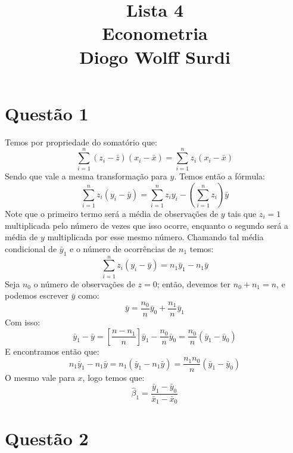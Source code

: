 \documentclass[12pt]{article}
\title{Lista 4\\
Econometria\\
Diogo Wolff Surdi}
\begin{document}
\maketitle 

\section*{Questão 1}
Temos por propriedade do somatório que:
\begin{equation*}
\sum_{i=1}^{n}(z_{i}-\bar{z})(x_{i}-\bar{x})=\sum_{i=1}^{n}z_{i}(x_{i}-\bar{x})
\end{equation*}
Sendo que vale a mesma transformação para $y$. Temos então a fórmula:
\begin{equation*}
\sum_{i=1}^{n}z_{i}(y_{i}-\bar{y})=\sum_{i=1}^{n}z_{i}y_{i}-\left(\sum_{i=1}^{n} z_{i}\right)\bar{y}
\end{equation*}
Note que o primeiro termo será a média de observações de $y$ tais que $z_{i}=1$ multiplicada pelo número de vezes que isso ocorre, enquanto o segundo será a média de $y$ multiplicada por esse mesmo número. Chamando tal média condicional de $\bar{y}_{1}$ e o número de ocorrências de $n_{1}$ temos:
\begin{equation*}
\sum_{i=1}^{n}z_{i}(y_{i}-\bar{y}) = n_{1}\bar{y}_{1}-n_{1}\bar{y}
\end{equation*}
Seja $n_{0}$ o número de observações de $z=0$; então, devemos ter $n_{0}+n_{1}=n$, e podemos escrever $\bar{y}$ como:
\begin{equation*}
\bar{y}=\frac{n_{0}}{n}\bar{y}_{0}+\frac{n_{1}}{n}\bar{y}_{1}
\end{equation*}
Com isso:
\begin{equation*}
\bar{y}_{1}-\bar{y}=\left[\frac{n-n_{1}}{n}\right]\bar{y}_{1}
-\frac{n_{0}}{n}\bar{y}_{0}=\frac{n_{0}}{n}(\bar{y}_{1}-\bar{y}_{0})
\end{equation*}
E encontramos então que:
\begin{equation*}
n_{1}\bar{y}_{1}-n_{1}\bar{y} = n_{1}(\bar{y}_{1}-n_{1}\bar{y}) =
\frac{n_{1}n_{0}}{n}(\bar{y}_{1}-\bar{y}_{0})
\end{equation*}
O mesmo vale para $x$, logo temos que:
\begin{equation*}
\hat{\beta}_{1}=\frac{\bar{y}_{1}-\bar{y}_{0}}{\bar{x}_{1}-\bar{x}_{0}}
\end{equation*}

\section*{Questão 2}
\end{document}
